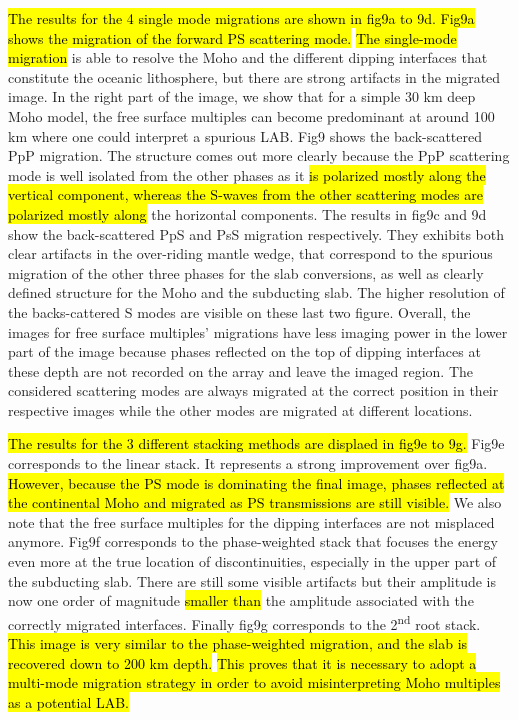\documentclass[10pt,a4paper]{article}
\begin{document}
\hl{The results for the 4 single mode migrations are shown in fig9a to 9d.
Fig9a shows the migration of the forward PS scattering mode.}
\hl{The single-mode migration} is able to resolve the Moho and the different dipping interfaces that constitute the oceanic lithosphere, but there are strong artifacts in the migrated image.
In the right part of the image, we show that for a simple 30 km deep Moho model, the free surface multiples can become predominant at around 100 km where one could interpret a spurious LAB.
Fig9 shows the back-scattered PpP migration.
The structure comes out more clearly because the PpP scattering mode is well isolated from the other phases as it \hl{is polarized mostly along the vertical component, whereas the S-waves from the other scattering modes are polarized mostly along} the horizontal components.
The results in fig9c and 9d show the back-scattered PpS and PsS migration respectively.
They exhibits both clear artifacts in the over-riding mantle wedge, that correspond to the spurious migration of the other three phases for the slab conversions, as well as clearly defined structure for the Moho and the subducting slab.
The higher resolution of the backs-cattered S modes are visible on these last two figure. %
Overall, the images for free surface multiples’ migrations have less imaging power in the lower part of the image because phases reflected on the top of dipping interfaces at these depth are not recorded on the array and leave the imaged region.
The considered scattering modes are always migrated at the correct position in their respective images while the other modes are migrated at different locations. 

\hl{The results for the 3 different stacking methods are displaed in fig9e to 9g.}
Fig9e corresponds to the linear stack.
It represents a strong improvement over fig9a.
\hl{However, because the PS mode is dominating the final image, phases reflected at the continental Moho and migrated as PS transmissions are still visible.}
We also note that the free surface multiples for the dipping interfaces are not misplaced anymore. %
Fig9f corresponds to the phase-weighted stack that focuses the energy even more at the true location of discontinuities, especially in the upper part of the subducting slab.
There are still some visible artifacts but their amplitude is now one order of magnitude \hl{smaller than} the amplitude associated with the correctly migrated interfaces.
Finally fig9g corresponds to the 2\textsuperscript{nd} root stack.
\hl{This image is very similar to the phase-weighted migration, and the slab is recovered down to 200 km depth.}
\hl{This proves that it is necessary to adopt a multi-mode migration strategy in order to avoid misinterpreting Moho multiples as a potential LAB.}
\end{document}
